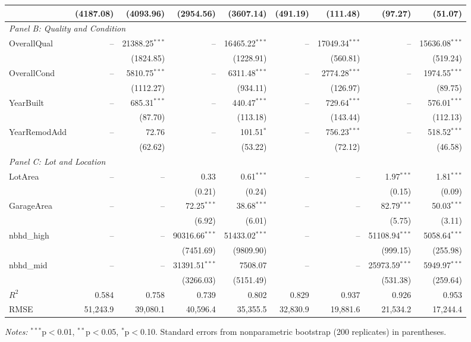 \documentclass[conference]{IEEEtran}
\begin{document}
\begin{table}[htbp]
{\begin{threeparttable}
\begin{tabular}{lrrrrrrrr}
					& (4187.08) & (4093.96) & (2954.56) & (3607.14) & (491.19) & (111.48) & (97.27) & (51.07) \\
					\midrule
					\multicolumn{9}{l}{\textit{Panel B: Quality and Condition}} \\
					\quad OverallQual & -- & 21388.25$^{***}$ & -- & 16465.22$^{***}$ & -- & 17049.34$^{***}$ & -- & 15636.08$^{***}$ \\
					&  & (1824.85) &  & (1228.91) &  & (560.81) &  & (519.24) \\
					\quad OverallCond & -- & 5810.75$^{***}$ & -- & 6311.48$^{***}$ & -- & 2774.28$^{***}$ & -- & 1974.55$^{***}$ \\
					&  & (1112.27) &  & (934.11) &  & (126.97) &  & (89.75) \\
					\quad YearBuilt & -- & 685.31$^{***}$ & -- & 440.47$^{***}$ & -- & 729.64$^{***}$ & -- & 576.01$^{***}$ \\
					&  & (87.70) &  & (113.18) &  & (143.44) &  & (112.13) \\
					\quad YearRemodAdd & -- & 72.76 & -- & 101.51$^{*}$ & -- & 756.23$^{***}$ & -- & 518.52$^{***}$ \\
					&  & (62.62) &  & (53.22) &  & (72.12) &  & (46.58) \\
					\midrule
					\multicolumn{9}{l}{\textit{Panel C: Lot and Location}} \\
					\quad LotArea & -- & -- & 0.33 & 0.61$^{***}$ & -- & -- & 1.97$^{***}$ & 1.81$^{***}$ \\
					&  &  & (0.21) & (0.24) &  &  & (0.15) & (0.09) \\
					\quad GarageArea & -- & -- & 72.25$^{***}$ & 38.68$^{***}$ & -- & -- & 82.79$^{***}$ & 50.03$^{***}$ \\
					&  &  & (6.92) & (6.01) &  &  & (5.75) & (3.11) \\
					\quad nbhd\_high & -- & -- & 90316.66$^{***}$ & 51433.02$^{***}$ & -- & -- & 51108.94$^{***}$ & 5058.64$^{***}$ \\
					&  &  & (7451.69) & (9809.90) &  &  & (999.15) & (255.98) \\
					\quad nbhd\_mid & -- & -- & 31391.51$^{***}$ & 7508.07 & -- & -- & 25973.59$^{***}$ & 5949.97$^{***}$ \\
					&  &  & (3266.03) & (5151.49) &  &  & (531.38) & (259.64) \\
					\midrule
					$R^2$ & 0.584 & 0.758 & 0.739 & 0.802 & 0.829 & 0.937 & 0.926 & 0.953 \\
					RMSE & 51,243.9 & 39,080.1 & 40,596.4 & 35,355.5 & 32,830.9 & 19,881.6 & 21,534.2 & 17,244.4 \\
					\bottomrule
				\end{tabular}
				\begin{tablenotes}
					\footnotesize
					\item \textit{Notes:} $^{***}$p$<$0.01, $^{**}$p$<$0.05, $^{*}$p$<$0.10. Standard errors from nonparametric bootstrap (200 replicates) in parentheses.
				\end{tablenotes}
			\end{threeparttable}
		}%
	\end{table}
	
\end{document}
